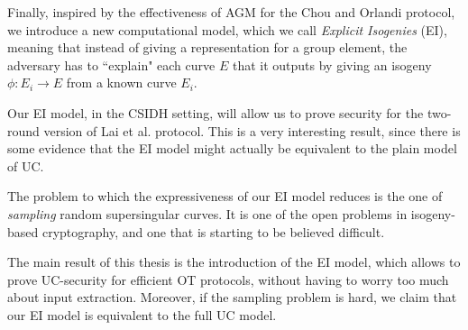 Finally, inspired by the effectiveness of AGM for the Chou and Orlandi protocol, we introduce a new computational model, which we call \emph{Explicit Isogenies} (EI), meaning that instead of giving a representation for a group element, the adversary has to ``explain" each curve $E$ that it outputs by giving an isogeny $\phi:E_i\to E$ from a known curve $E_i$.

Our EI model, in the CSIDH setting, will allow us to prove security for the two-round version of Lai et al. protocol. This is a very interesting result, since there is some evidence that the EI model might actually be equivalent to the plain model of UC.

The problem to which the expressiveness of our EI model reduces is the one of \emph{sampling} random supersingular curves. It is one of the open problems in isogeny-based cryptography, and one that is starting to be believed difficult.

The main result of this thesis is the introduction of the EI model, which allows to prove UC-security for efficient OT protocols, without having to worry too much about input extraction. Moreover, if the sampling problem is hard, we claim that our EI model is equivalent to the full UC model.

